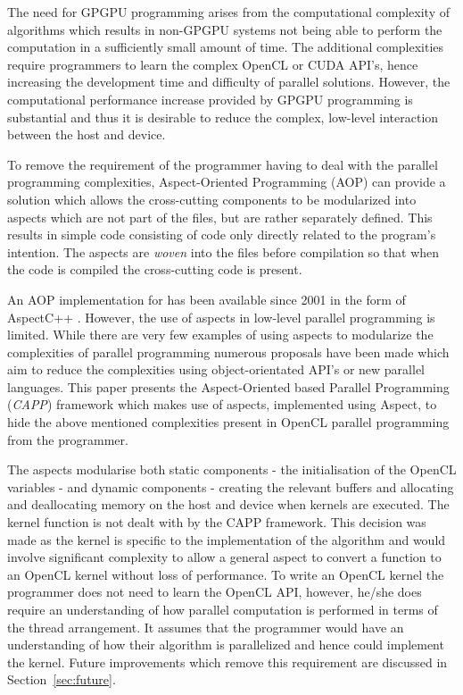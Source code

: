 \documentclass{sig-alternate-05-2015}
\begin{document}
The need for GPGPU programming arises from the computational complexity of
algorithms which results in non-GPGPU systems not being able to perform the
computation in a sufficiently small amount of time. The additional complexities
require programmers to learn the complex OpenCL or CUDA API's, hence increasing
the development time and difficulty of parallel solutions. However, the computational
performance increase
provided by GPGPU programming is substantial and thus it is desirable to reduce the complex, low-level
interaction between the host and device.

To remove the requirement of the programmer having to deal with the parallel
programming complexities, 
Aspect-Oriented Programming  (AOP) \cite{gregor:aop} can provide a solution which 
allows the cross-cutting components to be modularized into aspects which are not
part of the \CPP files, but are rather separately defined. This
results in simple \CPP code consisting of code only directly related to 
the program's intention. The aspects are \textit{woven} into the \CPP files before 
compilation so that when the code is compiled the cross-cutting code is present.

An AOP implementation for \CPP has been available  since 2001 in the form of AspectC++ 
\cite{gal:acppprop, olaf:app}. However, the use of aspects in low-level
parallel programming is limited. While there are very few examples of using
aspects to modularize the complexities of parallel programming numerous proposals 
have been made which aim to reduce the complexities using object-orientated
API's or new parallel languages.  This paper presents the \CPP Aspect-Oriented based Parallel
Programming (\textit{CAPP}) framework which makes use of aspects, implemented using Aspect\CPP, to 
hide the above mentioned complexities present in OpenCL parallel programming 
from the programmer. 

The aspects modularise both static components - the initialisation of the
OpenCL variables - and dynamic components - creating the relevant buffers
and allocating and deallocating memory on the host and device when kernels are
executed. The kernel function is not dealt with by the  CAPP framework. This
decision was made as the kernel is specific to the implementation of the
algorithm and would involve significant complexity to allow a general aspect to
convert a \CPP function to an OpenCL kernel without loss of performance. To write 
an OpenCL kernel the programmer does not need to learn the OpenCL API, however,
he/she does require an understanding of how parallel computation is performed in terms of
the thread arrangement. It assumes that the programmer would have an
understanding of how their algorithm is parallelized and hence could implement
the kernel. Future improvements which remove this requirement are discussed in
Section~\ref{sec:future}.
\end{document}
